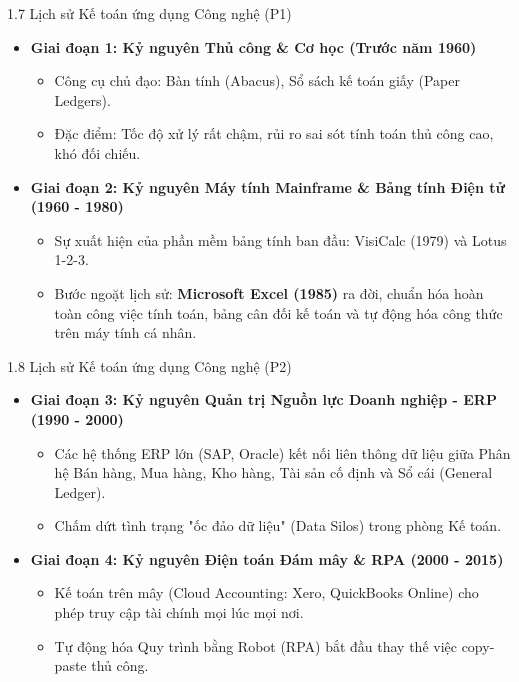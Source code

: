 \documentclass[aspectratio=169]{beamer}
\begin{document}
\begin{frame}{1.7 Lịch sử Kế toán ứng dụng Công nghệ (P1)}
    \begin{itemize}
        \item \textbf{Giai đoạn 1: Kỷ nguyên Thủ công \& Cơ học (Trước năm 1960)}
        \begin{itemize}
            \item Công cụ chủ đạo: Bàn tính (Abacus), Sổ sách kế toán giấy (Paper Ledgers).
            \item Đặc điểm: Tốc độ xử lý rất chậm, rủi ro sai sót tính toán thủ công cao, khó đối chiếu.
        \end{itemize}
        \item \textbf{Giai đoạn 2: Kỷ nguyên Máy tính Mainframe \& Bảng tính Điện tử (1960 - 1980)}
        \begin{itemize}
            \item Sự xuất hiện của phần mềm bảng tính ban đầu: VisiCalc (1979) và Lotus 1-2-3.
            \item Bước ngoặt lịch sử: \textbf{Microsoft Excel (1985)} ra đời, chuẩn hóa hoàn toàn công việc tính toán, bảng cân đối kế toán và tự động hóa công thức trên máy tính cá nhân.
        \end{itemize}
    \end{itemize}
\end{frame}

\begin{frame}{1.8 Lịch sử Kế toán ứng dụng Công nghệ (P2)}
    \begin{itemize}
        \item \textbf{Giai đoạn 3: Kỷ nguyên Quản trị Nguồn lực Doanh nghiệp - ERP (1990 - 2000)}
        \begin{itemize}
            \item Các hệ thống ERP lớn (SAP, Oracle) kết nối liên thông dữ liệu giữa Phân hệ Bán hàng, Mua hàng, Kho hàng, Tài sản cố định và Sổ cái (General Ledger).
            \item Chấm dứt tình trạng "ốc đảo dữ liệu" (Data Silos) trong phòng Kế toán.
        \end{itemize}
        \item \textbf{Giai đoạn 4: Kỷ nguyên Điện toán Đám mây \& RPA (2000 - 2015)}
        \begin{itemize}
            \item Kế toán trên mây (Cloud Accounting: Xero, QuickBooks Online) cho phép truy cập tài chính mọi lúc mọi nơi.
            \item Tự động hóa Quy trình bằng Robot (RPA) bắt đầu thay thế việc copy-paste thủ công.
        \end{itemize}
    \end{itemize}
\end{frame}
\end{document}
